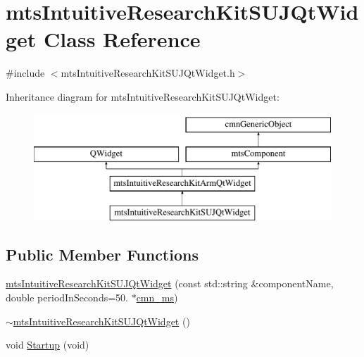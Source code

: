 \hypertarget{classmts_intuitive_research_kit_s_u_j_qt_widget}{\section{mts\-Intuitive\-Research\-Kit\-S\-U\-J\-Qt\-Widget Class Reference}
\label{classmts_intuitive_research_kit_s_u_j_qt_widget}
}


{\ttfamily \#include $<$mts\-Intuitive\-Research\-Kit\-S\-U\-J\-Qt\-Widget.\-h$>$}

Inheritance diagram for mts\-Intuitive\-Research\-Kit\-S\-U\-J\-Qt\-Widget\-:\begin{figure}[H]
\begin{center}
\leavevmode
\includegraphics[height=4.000000cm]{d6/d66/classmts_intuitive_research_kit_s_u_j_qt_widget}
\end{center}
\end{figure}
\subsection*{Public Member Functions}
\begin{DoxyCompactItemize}
\item 
\hyperlink{classmts_intuitive_research_kit_s_u_j_qt_widget_a5e6dcc1473d1f8f5b691072435b14579}{mts\-Intuitive\-Research\-Kit\-S\-U\-J\-Qt\-Widget} (const std\-::string \&component\-Name, double period\-In\-Seconds=50. $\ast$\hyperlink{cmn_units_8h_aaf4d3f2fafb9b4a95606544b9d876b4a}{cmn\-\_\-ms})
\item 
\hyperlink{classmts_intuitive_research_kit_s_u_j_qt_widget_aa34ca3c6326a596bca64e01e4dfdd927}{$\sim$mts\-Intuitive\-Research\-Kit\-S\-U\-J\-Qt\-Widget} ()
\item 
void \hyperlink{classmts_intuitive_research_kit_s_u_j_qt_widget_a0acf762532cce984fb588472faa839b6}{Startup} (void)
\end{DoxyCompactItemize}
